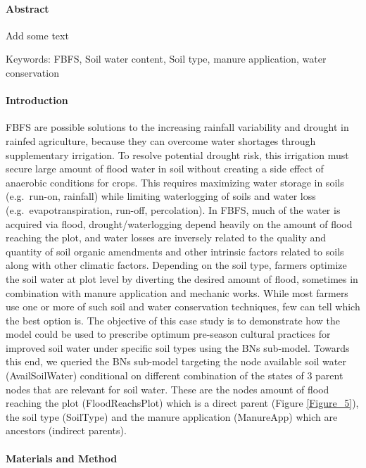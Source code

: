 \documentclass[11pt,preprint]{article}
\begin{document}
\hypertarget{abstract}{%
\paragraph{Abstract}\label{abstract}}

Add some text

Keywords: FBFS, Soil water content, Soil type, manure application, water
conservation

\hypertarget{introduction-1}{%
\paragraph{Introduction}\label{introduction-1}}

FBFS are possible solutions to the increasing rainfall variability and
drought in rainfed agriculture, because they can overcome water
shortages through supplementary irrigation. To resolve potential drought
risk, this irrigation must secure large amount of flood water in soil
without creating a side effect of anaerobic conditions for crops. This
requires maximizing water storage in soils (e.g.~run-on, rainfall) while
limiting waterlogging of soils and water loss (e.g.~evapotranspiration,
run-off, percolation). In FBFS, much of the water is acquired via flood,
drought/waterlogging depend heavily on the amount of flood reaching the
plot, and water losses are inversely related to the quality and quantity
of soil organic amendments and other intrinsic factors related to soils
along with other climatic factors. Depending on the soil type, farmers
optimize the soil water at plot level by diverting the desired amount of
flood, sometimes in combination with manure application and mechanic
works. While most farmers use one or more of such soil and water
conservation techniques, few can tell which the best option is. The
objective of this case study is to demonstrate how the model could be
used to prescribe optimum pre-season cultural practices for improved
soil water under specific soil types using the BNs sub-model. Towards
this end, we queried the BNs sub-model targeting the node available soil
water (AvailSoilWater) conditional on different combination of the
states of 3 parent nodes that are relevant for soil water. These are the
nodes amount of flood reaching the plot (FloodReachsPlot) which is a
direct parent (Figure \ref{Figure_5}), the soil type (SoilType) and the
manure application (ManureApp) which are ancestors (indirect parents).

\hypertarget{materials-and-method}{%
\paragraph{Materials and Method}\label{materials-and-method}}
\end{document}
